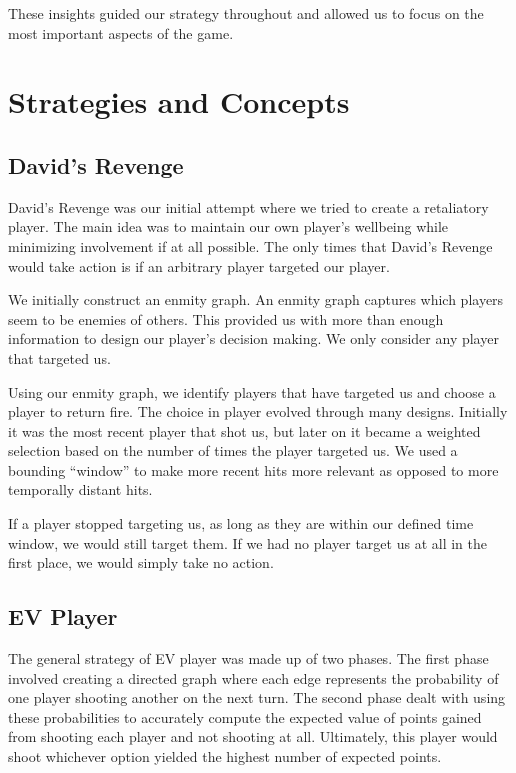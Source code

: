\documentclass[
10pt, %
letterpaper, %
oneside, %
headinclude,footinclude, %
english
]{article}
\begin{document}
These insights guided our strategy throughout and allowed us to focus on the most important aspects of the game.

\section{Strategies and Concepts}

\subsection{David's Revenge}

David's Revenge was our initial attempt where we tried to create a retaliatory player. The main idea was to maintain our own player's wellbeing while minimizing involvement if at all possible. The only times that David's Revenge would take action is if an arbitrary player targeted our player.

We initially construct an enmity graph. An enmity graph captures which players seem to be enemies of others. This provided us with more than enough information to design our player's decision making. We only consider any player that targeted us.

Using our enmity graph, we identify players that have targeted us and choose a player to return fire. The choice in player evolved through many designs. Initially it was the most recent player that shot us, but later on it became a weighted selection based on the number of times the player targeted us. We used a bounding ``window'' to make more recent hits more relevant as opposed to more temporally distant hits.

If a player stopped targeting us, as long as they are within our defined time window, we would still target them. If we had no player target us at all in the first place, we would simply take no action.

\subsection{EV Player}
The general strategy of EV player was made up of two phases. The first phase involved creating a directed graph where each edge represents the probability of one player shooting another on the next turn. The second phase dealt with using these probabilities to accurately compute the expected value of points gained from shooting each player and not shooting at all. Ultimately, this player would shoot whichever option yielded the highest number of expected points. 
\end{document}
